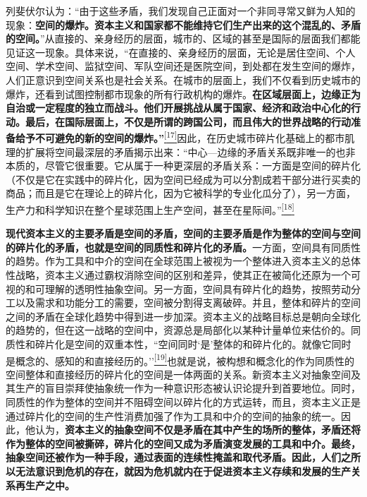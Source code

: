 \documentclass[UTF8, fontset = sourcesans, a4paper, oneside, zihao =
-4, scheme=chinese, no-math, space=true]{ctexbook}
\begin{document}
列斐伏尔认为：``由于这些矛盾，我们发现自己正面对一个非同寻常又鲜为人知的现象：\textbf{空间的爆炸。资本主义和国家都不能维持它们生产出来的这个混乱的、矛盾的空间。}''从直接的、亲身经历的层面，城市的、区域的甚至是国际的层面我们都能见证这一现象。具体来说，``在直接的、亲身经历的层面，无论是居住空间、个人空间、学术空间、监狱空间、军队空间还是医院空间，到处都在发生空间的爆炸，人们正意识到空间关系也是社会关系。在城市的层面上，我们不仅看到历史城市的爆炸，还看到试图控制都市现象的所有行政机构的爆炸。\textbf{在区域层面上，边缘正为自治或一定程度的独立而战斗。他们开展挑战从属于国家、经济和政治中心化的行动。最后，在国际层面上，不仅是所谓的跨国公司，而且伟大的世界战略的行动准备给予不可避免的新的空间的爆炸。''}\protect\hypertarget{part0008_split_001.htmlux5cux23w17}{}{}\protect\hyperlink{part0008_split_003.htmlux5cux23m17}{\textsuperscript{{[}17{]}}}因此，在历史城市碎片化基础上的都市肌理的扩展将空间最深层的矛盾揭示出来：``中心---边缘的矛盾关系既非唯一的也非本质的，尽管它很重要。它从属于一种更深层的矛盾关系：一方面是空间的碎片化（不仅是它在实践中的碎片化，因为空间已经成为可以分割成若干部分进行买卖的商品；而且是它在理论上的碎片化，因为它被科学的专业化瓜分了），另一方面，生产力和科学知识在整个星球范围上生产空间，甚至在星际间。''\protect\hypertarget{part0008_split_001.htmlux5cux23w18}{}{}\protect\hyperlink{part0008_split_003.htmlux5cux23m18}{\textsuperscript{{[}18{]}}}

\textbf{现代资本主义的主要矛盾是空间的矛盾，空间的主要矛盾是作为整体的空间与空间的碎片化的矛盾，也就是空间的同质性和碎片化的矛盾。}一方面，空间具有同质性的趋势。作为工具和中介的空间在全球范围上被视为一个整体进入资本主义的总体性战略，资本主义通过霸权消除空间的区别和差异，使其正在被简化还原为一个可视的和可理解的透明性抽象空间。另一方面，空间具有碎片化的趋势，按照劳动分工以及需求和功能分工的需要，空间被分割得支离破碎。并且，整体和碎片的空间之间的矛盾在全球化趋势中得到进一步加深。资本主义的战略目标总是朝向全球化的趋势的，但在这一战略的空间中，资源总是局部化以某种计量单位来估价的。同质性和碎片化是空间的双重本性，``空间同时`是'整体的和碎片化的。就像它同时是概念的、感知的和直接经历的。''\protect\hypertarget{part0008_split_001.htmlux5cux23w19}{}{}\protect\hyperlink{part0008_split_003.htmlux5cux23m19}{\textsuperscript{{[}19{]}}}也就是说，被构想和概念化的作为同质性的空间整体和直接经历的碎片化的空间是一体两面的关系。新资本主义对抽象空间及其生产的盲目崇拜使抽象统一作为一种意识形态被认识论提升到首要地位。同时，同质性的作为整体的空间并不阻碍空间以碎片化的方式运转，而且，资本主义正是通过碎片化的空间的生产性消费加强了作为工具和中介的空间的抽象的统一。因此，他认为，\textbf{资本主义的抽象空间不仅是矛盾在其中产生的场所的整体，矛盾还将作为整体的空间被撕碎，碎片化的空间又成为矛盾演变发展的工具和中介。最终，抽象空间还被作为一种手段，通过表面的连续性掩盖和取代矛盾。因此，人们之所以无法意识到危机的存在，就因为危机就内在于促进资本主义存续和发展的生产关系再生产之中。}
\end{document}

